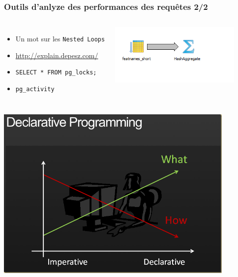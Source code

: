 \documentclass{beamer}
\begin{document}
\begin{frame}
  \frametitle{Outils d'anlyze des performances des requêtes 2/2}

  \vfill

\begin{columns}[c]
\begin{itemize}
  \item Un mot sur les \texttt{Nested Loops}
  \item \url{http://explain.depesz.com/}
  \item \texttt{SELECT * FROM pg\_locks;}
  \item \texttt{pg\_activity}
\end{itemize}

\begin{center}
  \includegraphics[height=8em]{pg91_btree_explain_like2.png}
\end{center}
\end{columns}
\end{frame}

\begin{frame}
  \includegraphics[height=23em]{declarative.png}
\end{frame}
\end{document}
